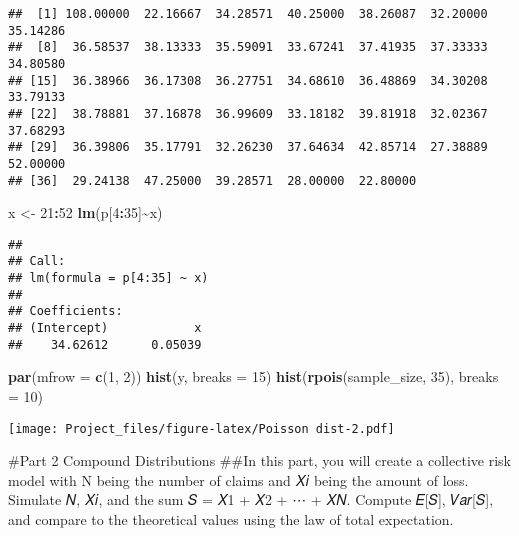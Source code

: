 \documentclass[
]{article}
\newenvironment{Shaded}{\begin{snugshade}}{\end{snugshade}}
\newcommand{\AttributeTok}[1]{\textcolor[rgb]{0.13,0.29,0.53}{#1}}
\newcommand{\DecValTok}[1]{\textcolor[rgb]{0.00,0.00,0.81}{#1}}
\newcommand{\FunctionTok}[1]{\textcolor[rgb]{0.13,0.29,0.53}{\textbf{#1}}}
\newcommand{\NormalTok}[1]{#1}
\newcommand{\OtherTok}[1]{\textcolor[rgb]{0.56,0.35,0.01}{#1}}
\newcommand{\SpecialCharTok}[1]{\textcolor[rgb]{0.81,0.36,0.00}{\textbf{#1}}}
\begin{document}
\begin{verbatim}
##  [1] 108.00000  22.16667  34.28571  40.25000  38.26087  32.20000  35.14286
##  [8]  36.58537  38.13333  35.59091  33.67241  37.41935  37.33333  34.80580
## [15]  36.38966  36.17308  36.27751  34.68610  36.48869  34.30208  33.79133
## [22]  38.78881  37.16878  36.99609  33.18182  39.81918  32.02367  37.68293
## [29]  36.39806  35.17791  32.26230  37.64634  42.85714  27.38889  52.00000
## [36]  29.24138  47.25000  39.28571  28.00000  22.80000
\end{verbatim}

\begin{Shaded}
\begin{Highlighting}[]
\NormalTok{x }\OtherTok{\textless{}{-}} \DecValTok{21}\SpecialCharTok{:}\DecValTok{52}
\FunctionTok{lm}\NormalTok{(p[}\DecValTok{4}\SpecialCharTok{:}\DecValTok{35}\NormalTok{]}\SpecialCharTok{\textasciitilde{}}\NormalTok{x)}
\end{Highlighting}
\end{Shaded}

\begin{verbatim}
## 
## Call:
## lm(formula = p[4:35] ~ x)
## 
## Coefficients:
## (Intercept)            x  
##    34.62612      0.05039
\end{verbatim}

\begin{Shaded}
\begin{Highlighting}[]
\FunctionTok{par}\NormalTok{(}\AttributeTok{mfrow =} \FunctionTok{c}\NormalTok{(}\DecValTok{1}\NormalTok{, }\DecValTok{2}\NormalTok{))}
\FunctionTok{hist}\NormalTok{(y, }\AttributeTok{breaks =} \DecValTok{15}\NormalTok{)}
\FunctionTok{hist}\NormalTok{(}\FunctionTok{rpois}\NormalTok{(sample\_size, }\DecValTok{35}\NormalTok{), }\AttributeTok{breaks =} \DecValTok{10}\NormalTok{)}
\end{Highlighting}
\end{Shaded}

\texttt{[image: Project\_files/figure-latex/Poisson dist-2.pdf]}

\#Part 2 Compound Distributions \#\#In this part, you will create a
collective risk model with N being the number of claims and 𝑋𝑖 being the
amount of loss. Simulate 𝑁, 𝑋𝑖, and the sum 𝑆 = 𝑋1 + 𝑋2 + ⋯ + 𝑋𝑁.
Compute 𝐸{[}𝑆{]}, 𝑉𝑎𝑟{[}𝑆{]}, and compare to the theoretical values
using the law of total expectation.
\end{document}
